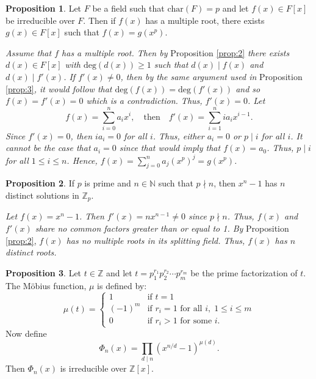 \documentclass[leqno]{article}
\makeatletter
\theoremstyle{definition}
\newtheorem{prop}{Proposition}
\theoremstyle{remark}
\let\oldproofname=\proofname
\renewcommand{\proofname}{\textit{\oldproofname}}
\theoremstyle{definition}
\renewenvironment{proof}[1][\proofname]{\par
  \pushQED{\qed}%
  \normalfont \topsep6\p@\@plus6\p@\relax
  \list{}{\leftmargin=0mm
          \rightmargin=0mm
          \settowidth{\itemindent}{\itshape#1}%
          \labelwidth=\itemindent
          \parsep=0pt \listparindent=0mm%
  }
  \item[\hskip\labelsep
        \itshape
    #1\@addpunct{.}]\ignorespaces
}{%
  \popQED\endlist\@endpefalse
}
\makeatother
\begin{document}
    \begin{prop}\label{prop:5}
        Let $F$ be a field such that $\text{char}(F)=p$ and let $f(x)\in F[x]$ be irreducible over $F$. Then if $f(x)$ has a multiple root, there exists $g(x)\in F[x]$ such that $f(x)=g(x^p)$. 
    \end{prop}
        \begin{proof}
            \emph{Assume that $f$ has a multiple root. Then by }Proposition \ref{prop:2}\emph{ there exists $d(x)\in F[x]$ with $\text{deg}(d(x))\geq 1$ such that $d(x)\mid f(x)$ and $d(x)\mid f'(x)$. If $f'(x)\neq 0$, then by the same argument used in} Proposition \ref{prop:3}\emph{, it would follow that $\text{deg}(f(x))=\text{deg}(f'(x))$ and so $f(x)=f'(x)=0$ which is a contradiction. Thus, $f'(x)=0$. Let}
                \begin{equation*}
                    f(x)=\sum\limits_{i=0}^na_ix^i,\quad\text{then}\quad f'(x)=\sum\limits_{i=1}^n ia_ix^{i-1}.
                \end{equation*}
            \emph{Since $f'(x)=0$, then $ia_i=0$ for all $i$. Thus, either $a_i=0$ or $p\mid i$ for all $i$. It cannot be the case that $a_i=0$ since that would imply that $f(x)=a_0$. Thus, $p\mid i$ for all $1\leq i\leq n$. Hence, $f(x)=\sum_{j=0}^na_j(x^p)^j=g(x^p)$. }
        \end{proof}
    \begin{prop}\label{prop:6}
        If $p$ is prime and $n\in\mathbb{N}$ such that $p\nmid n$, then $x^n-1$ has $n$ distinct solutions in $\mathbb{Z}_p$.
    \end{prop}
        \begin{proof}
            \emph{Let $f(x)=x^n-1$. Then $f'(x)=nx^{n-1}\neq 0$ since $p\nmid n$. Thus, $f(x)$ and $f'(x)$ share no common factors greater than or equal to 1. By} Proposition \ref{prop:2},\emph{ $f(x)$ has no multiple roots  in its splitting field. Thus, $f(x)$ has $n$ distinct roots.}
        \end{proof}
    \begin{prop}\label{prop:7}
        Let $t\in\mathbb{Z}$ and let $t=p_1^{r_1}p_2^{r_2}\cdots p_m^{r_m}$ be the prime factorization of $t$. The M\"obius function, $\mu$ is defined by: 
            \begin{equation*}
                \mu(t)=\begin{cases} 
                    1 &\text{if } t=1 \\
                    (-1)^m &\text{if } r_i=1 \text{ for all } i,\; 1\leq i\leq m \\
                    0 &\text{if } r_i>1 \text{ for some } i.
                \end{cases}
            \end{equation*}
        Now define
            \begin{equation*}
                \Phi_n(x)=\prod_{d\mid n}(x^{n/d}-1)^{\mu(d)}.
            \end{equation*}
        Then $\Phi_n(x)$ is irreducible over $\mathbb{Z}[x]$.
    \end{prop}
\end{document}
